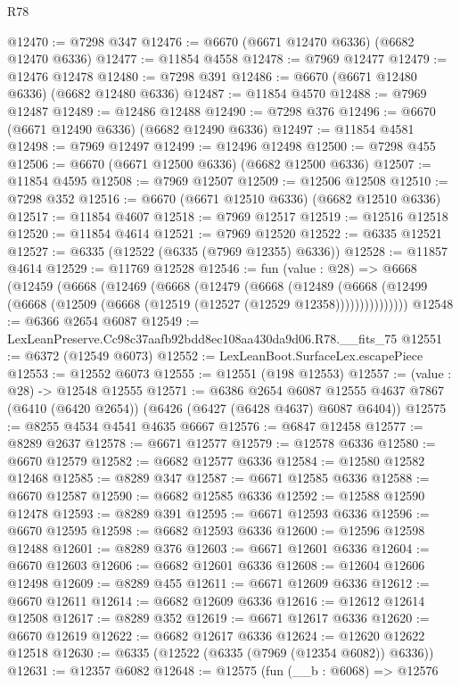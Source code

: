 \begin{lexlean}{R78}
\begin{coremodule}
@12470 := @7298 @347
@12476 := @6670 (@6671 @12470 @6336) (@6682 @12470 @6336)
@12477 := @11854 @4558
@12478 := @7969 @12477
@12479 := @12476 @12478
@12480 := @7298 @391
@12486 := @6670 (@6671 @12480 @6336) (@6682 @12480 @6336)
@12487 := @11854 @4570
@12488 := @7969 @12487
@12489 := @12486 @12488
@12490 := @7298 @376
@12496 := @6670 (@6671 @12490 @6336) (@6682 @12490 @6336)
@12497 := @11854 @4581
@12498 := @7969 @12497
@12499 := @12496 @12498
@12500 := @7298 @455
@12506 := @6670 (@6671 @12500 @6336) (@6682 @12500 @6336)
@12507 := @11854 @4595
@12508 := @7969 @12507
@12509 := @12506 @12508
@12510 := @7298 @352
@12516 := @6670 (@6671 @12510 @6336) (@6682 @12510 @6336)
@12517 := @11854 @4607
@12518 := @7969 @12517
@12519 := @12516 @12518
@12520 := @11854 @4614
@12521 := @7969 @12520
@12522 := @6335 @12521
@12527 := @6335 (@12522 (@6335 (@7969 @12355) @6336))
@12528 := @11857 @4614
@12529 := @11769 @12528
@12546 := fun (value : @28) =>
  @6668
    (@12459
      (@6668
        (@12469
          (@6668
            (@12479
              (@6668
                (@12489
                  (@6668 (@12499 (@6668 (@12509 (@6668 (@12519 (@12527 (@12529 @12358)))))))))))))))
@12548 := @6366 @2654 @6087
@12549 := LexLeanPreserve.Cc98c37aafb92bdd8ec108aa430da9d06.R78.__fits_75
@12551 := @6372 (@12549 @6073)
@12552 := LexLeanBoot.SurfaceLex.escapePiece
@12553 := @12552 @6073
@12555 := @12551 (@198 @12553)
@12557 := (value : @28) -> @12548 @12555
@12571 := @6386
    @2654
    @6087
    @12555
    @4637
    @7867
    (@6410 (@6420 @2654))
    (@6426 (@6427 (@6428 @4637) @6087 @6404))
@12575 := @8255 @4534 @4541 @4635 @6667
@12576 := @6847 @12458
@12577 := @8289 @2637
@12578 := @6671 @12577
@12579 := @12578 @6336
@12580 := @6670 @12579
@12582 := @6682 @12577 @6336
@12584 := @12580 @12582 @12468
@12585 := @8289 @347
@12587 := @6671 @12585 @6336
@12588 := @6670 @12587
@12590 := @6682 @12585 @6336
@12592 := @12588 @12590 @12478
@12593 := @8289 @391
@12595 := @6671 @12593 @6336
@12596 := @6670 @12595
@12598 := @6682 @12593 @6336
@12600 := @12596 @12598 @12488
@12601 := @8289 @376
@12603 := @6671 @12601 @6336
@12604 := @6670 @12603
@12606 := @6682 @12601 @6336
@12608 := @12604 @12606 @12498
@12609 := @8289 @455
@12611 := @6671 @12609 @6336
@12612 := @6670 @12611
@12614 := @6682 @12609 @6336
@12616 := @12612 @12614 @12508
@12617 := @8289 @352
@12619 := @6671 @12617 @6336
@12620 := @6670 @12619
@12622 := @6682 @12617 @6336
@12624 := @12620 @12622 @12518
@12630 := @6335 (@12522 (@6335 (@7969 (@12354 @6082)) @6336))
@12631 := @12357 @6082
@12648 := @12575
    (fun (__b : @6068) =>
    @12576

\end{coremodule}
\end{lexlean}
